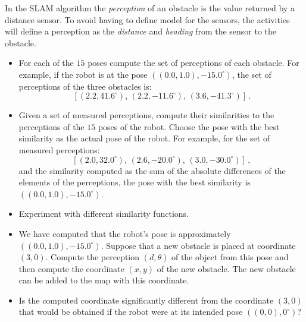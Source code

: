 In the SLAM algorithm the \emph{perception} of an obstacle is the value returned by a distance sensor. To avoid having to define model for the sensors, the activities will define a perception as the \emph{distance} and \emph{heading} from the sensor to the obstacle.

\begin{framed}
\begin{itemize}
\item For each of the $15$ poses compute the set of perceptions of each obstacle. For example, if the robot is at the pose $((0.0,1.0),-15.0^\circ)$, the set of perceptions of the three obstacles is:
\[
[( 2.2,  41.6^\circ),\,  ( 2.2, -11.6^\circ),\,  ( 3.6, -41.3^\circ)]\,.
\]
\item Given a set of measured perceptions, compute their similarities to the perceptions of the $15$ poses of the robot. Choose the pose with the best similarity as the actual pose of the robot. For example, for the set of measured perceptions:
\[
[( 2.0,  32.0^\circ),\,  ( 2.6, -20.0^\circ),\,  ( 3.0, -30.0^\circ)]\,,
\]
and the similarity computed as the sum of the absolute differences of the elements of the perceptions, the pose with the best similarity is $((0.0, 1.0),-15.0^\circ)$.
\item Experiment with different similarity functions.
\item We have computed that the robot's pose is approximately $((0.0, 1.0),-15.0^\circ)$. Suppose that a new obstacle is placed at coordinate $(3,0)$. Compute the perception $(d,\theta)$ of the object from this pose and then compute the coordinate $(x,y)$ of the new obstacle. The new obstacle can be added to the map with this coordinate.
\item Is the computed coordinate significantly different from the coordinate $(3,0)$ that would be obtained if the robot were at its intended pose $((0,0),0^\circ)$?
\end{itemize}
\end{framed}

